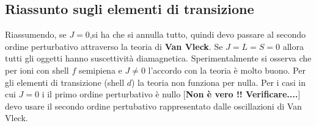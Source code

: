 \subsection{Riassunto sugli elementi di transizione}
Riassumendo, se $J=0$,si ha che si annulla tutto, quindi devo passare al secondo ordine perturbativo attraverso la teoria di \textbf{Van Vleck}. Se $J=L=S=0$ allora tutti gli oggetti hanno suscettività diamagnetica. Sperimentalmente si osserva che per ioni con shell $f$ semipiena e $J\neq0$ l'accordo con la teoria è molto buono. Per gli elementi di transizione (shell $d$) la teoria non funziona per nulla. Per i casi in cui $J=0$ i il primo ordine perturbativo è nullo [\textbf{Non \`e vero !! Verificare....}]
devo usare il secondo ordine pertubativo rappresentato dalle oscillazioni di Van Vleck.


